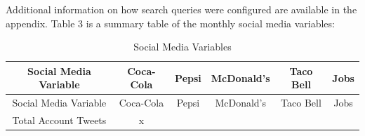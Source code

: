 \documentclass[12pt,oneside]{chicagocapstone}
\begin{document}
Additional information on how search queries were configured are available in the appendix. Table 3 is a summary table of the monthly social media variables:
\begin{longtable}[]{@{}cccccc@{}}
\caption{\label{tab:inher} Social Media Variables}\tabularnewline
\toprule
\begin{minipage}[b]{0.21\columnwidth}\centering
Social Media Variable\strut
\end{minipage} & \begin{minipage}[b]{0.11\columnwidth}\centering
Coca-Cola\strut
\end{minipage} & \begin{minipage}[b]{0.12\columnwidth}\centering
Pepsi\strut
\end{minipage} & \begin{minipage}[b]{0.14\columnwidth}\centering
McDonald's\strut
\end{minipage} & \begin{minipage}[b]{0.14\columnwidth}\centering
Taco Bell\strut
\end{minipage} & \begin{minipage}[b]{0.12\columnwidth}\centering
Jobs\strut
\end{minipage}\tabularnewline
\midrule
\endfirsthead
\toprule
\begin{minipage}[b]{0.21\columnwidth}\centering
Social Media Variable\strut
\end{minipage} & \begin{minipage}[b]{0.11\columnwidth}\centering
Coca-Cola\strut
\end{minipage} & \begin{minipage}[b]{0.12\columnwidth}\centering
Pepsi\strut
\end{minipage} & \begin{minipage}[b]{0.14\columnwidth}\centering
McDonald's\strut
\end{minipage} & \begin{minipage}[b]{0.14\columnwidth}\centering
Taco Bell\strut
\end{minipage} & \begin{minipage}[b]{0.12\columnwidth}\centering
Jobs\strut
\end{minipage}\tabularnewline
\midrule
\endhead
\begin{minipage}[t]{0.21\columnwidth}\centering
Total Account Tweets\strut
\end{minipage} & \begin{minipage}[t]{0.11\columnwidth}\centering
x\strut
\end{minipage} & \begin{minipage}[t]{0.12\columnwidth}\centering

\end{minipage}
\end{longtable}
\end{document}
